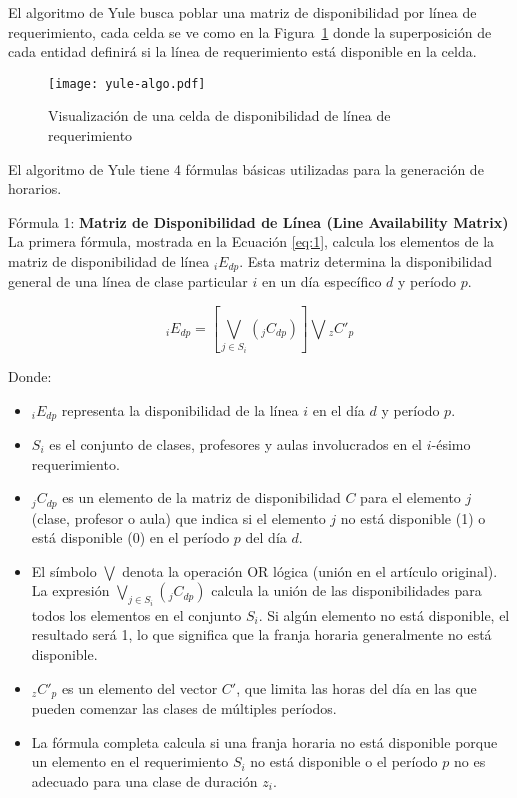 El algoritmo de Yule busca poblar una matriz de disponibilidad por línea de requerimiento, cada celda se ve como en la Figura~\ref{fig:yuleAlgorithm} donde la superposición de cada entidad definirá si la línea de requerimiento está disponible en la celda.
\begin{figure}[H]
    \centering
    \caption{Visualización de una celda de disponibilidad de línea de requerimiento}
    \texttt{[image: yule-algo.pdf]}
    \label{fig:yuleAlgorithm}
\end{figure}

El algoritmo de Yule tiene 4 fórmulas básicas utilizadas para la generación de horarios.

Fórmula 1: \textbf{Matriz de Disponibilidad de Línea (Line Availability Matrix)} La primera fórmula, mostrada en la Ecuación \ref{eq:1}, calcula los elementos de la matriz de disponibilidad de línea \( _iE_{dp} \).
Esta matriz determina la disponibilidad general de una línea de clase particular \( i \) en un día específico \( d \) y período \( p \).

\begin{equation}
\label{eq:1}
_iE_{dp} = \left[\bigvee_{j \in S_i} (_jC_{dp})\right] \bigvee {}_zC'_{p}
\end{equation}

Donde:
\begin{itemize}
    \item \( _iE_{dp} \) representa la disponibilidad de la línea \( i \) en el día \( d \) y período \( p \).
    \item \( S_i \) es el conjunto de clases, profesores y aulas involucrados en el \( i \)-ésimo requerimiento.
    \item \( _jC_{dp} \) es un elemento de la matriz de disponibilidad \( C \) para el elemento \( j \) (clase, profesor o aula) que indica si el elemento \( j \) no está disponible (1) o está disponible (0) en el período \( p \) del día \( d \).
    \item El símbolo \(\bigvee\) denota la operación OR lógica (unión en el artículo original).
	La expresión \(\bigvee_{j \in S_i} (_jC_{dp})\) calcula la unión de las disponibilidades para todos los elementos en el conjunto \( S_i \).
	Si algún elemento no está disponible, el resultado será 1, lo que significa que la franja horaria generalmente no está disponible.
    \item \( _zC'_{p} \) es un elemento del vector \( C' \), que limita las horas del día en las que pueden comenzar las clases de múltiples períodos.
    \item La fórmula completa calcula si una franja horaria no está disponible porque un elemento en el requerimiento \( S_i \) no está disponible o el período \( p \) no es adecuado para una clase de duración \( z_i \).
\end{itemize}

